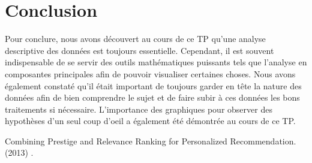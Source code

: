 \documentclass{article}
\begin{document}
\begin{multicols}{2}
%	
	
%

	
\end{multicols}
\newpage
\section*{Conclusion}

    Pour conclure, nous avons découvert au cours de ce TP qu'une analyse descriptive des données est toujours essentielle. Cependant, il est souvent indispensable de se servir des outils mathématiques puissants tels que l'analyse en composantes principales afin de pouvoir visualiser certaines choses. Nous avons également constaté qu'il était important de toujours garder en tête la nature des données afin de bien comprendre le sujet et de faire subir à ces données les bons traitements si nécessaire. L'importance des graphiques pour observer des hypothèses d'un seul coup d'oeil a également été démontrée au cours de ce TP. %

\begin{thebibliography}{99} %

Combining Prestige and Relevance Ranking for Personalized Recommendation.(2013)
.



\end{thebibliography}
\end{document}
